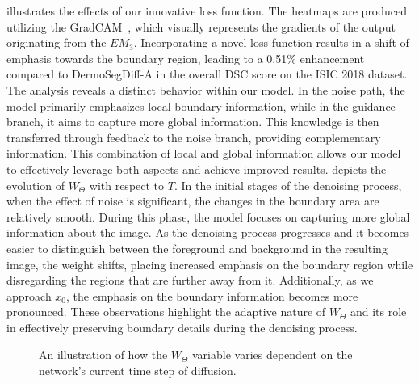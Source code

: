 \documentclass[runningheads]{llncs}
\begin{document}
 illustrates the effects of our innovative loss function. The heatmaps are produced utilizing the GradCAM~\cite{selvaraju2017grad}, which visually represents the gradients of the output originating from the $EM_3$. Incorporating a novel loss function results in a shift of emphasis towards the boundary region, leading to a 0.51\% enhancement compared to DermoSegDiff-A in the overall DSC score on the ISIC 2018 dataset. The analysis reveals a distinct behavior within our model. In the noise path, the model primarily emphasizes local boundary information, while in the guidance branch, it aims to capture more global information. This knowledge is then transferred through feedback to the noise branch, providing complementary information. This combination of local and global information allows our model to effectively leverage both aspects and achieve improved results.  depicts the evolution of $W_{\Theta}$ with respect to $T$. In the initial stages of the denoising process, when the effect of noise is significant, the changes in the boundary area are relatively smooth. During this phase, the model focuses on capturing more global information about the image. As the denoising process progresses and it becomes easier to distinguish between the foreground and background in the resulting image, the weight shifts, placing increased emphasis on the boundary region while disregarding the regions that are further away from it. Additionally, as we approach $x_0$, the emphasis on the boundary information becomes more pronounced. These observations highlight the adaptive nature of $W_{\Theta}$ and its role in effectively preserving boundary details during the denoising process.
\begin{figure}[!t]
    \centering
    
    \caption{An illustration of how the $W_{\Theta}$ variable varies dependent on the network's current time step of diffusion.} \label{fig:impact-w}
\end{figure}
\end{document}
